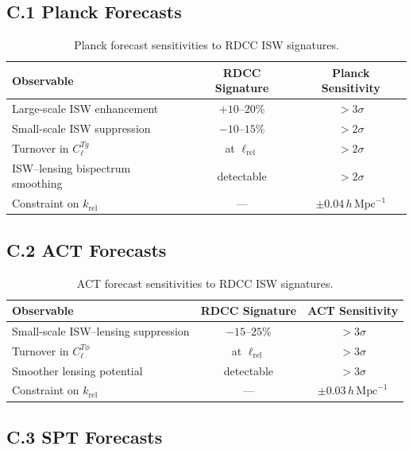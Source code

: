 \documentclass[11pt,a4paper]{article}
\begin{document}
\subsection*{C.1 Planck Forecasts}

\begin{table}[H]
\centering
\begin{tabular}{lcc}
\hline
\textbf{Observable} & \textbf{RDCC Signature} & \textbf{Planck Sensitivity} \\
\hline
Large-scale ISW enhancement & $+10$--$20\%$ & $>3\sigma$ \\
Small-scale ISW suppression & $-10$--$15\%$ & $>2\sigma$ \\
Turnover in $C_{\ell}^{Tg}$ & at $\ell_{\mathrm{rel}}$ & $>2\sigma$ \\
ISW--lensing bispectrum smoothing & detectable & $>2\sigma$ \\
Constraint on $k_{\mathrm{rel}}$ & --- & $\pm 0.04\,h\,\mathrm{Mpc}^{-1}$ \\
\hline
\end{tabular}
\caption{Planck forecast sensitivities to RDCC ISW signatures.}
\end{table}

\subsection*{C.2 ACT Forecasts}

\begin{table}[H]
\centering
\begin{tabular}{lcc}
\hline
\textbf{Observable} & \textbf{RDCC Signature} & \textbf{ACT Sensitivity} \\
\hline
Small-scale ISW--lensing suppression & $-15$--$25\%$ & $>3\sigma$ \\
Turnover in $C_{\ell}^{T\phi}$ & at $\ell_{\mathrm{rel}}$ & $>3\sigma$ \\
Smoother lensing potential & detectable & $>3\sigma$ \\
Constraint on $k_{\mathrm{rel}}$ & --- & $\pm 0.03\,h\,\mathrm{Mpc}^{-1}$ \\
\hline
\end{tabular}
\caption{ACT forecast sensitivities to RDCC ISW signatures.}
\end{table}

\subsection*{C.3 SPT Forecasts}
\end{document}
